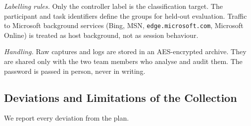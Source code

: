 \textit{Labelling rules.} Only the controller label is the classification target. The participant and task identifiers define the groups for held-out evaluation. Traffic to Microsoft background services (Bing, MSN, \texttt{edge.microsoft.com}, Microsoft Online) is treated as host background, not as session behaviour.

\textit{Handling.} Raw captures and logs are stored in an AES-encrypted archive. They are shared only with the two team members who analyse and audit them. The password is passed in person, never in writing.

\subsection{Deviations and Limitations of the Collection}
\label{sec:method-limits}
We report every deviation from the plan.
